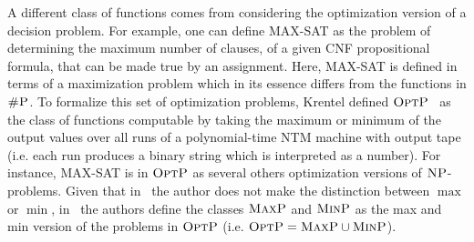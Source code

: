 A different class of functions comes from considering the optimization version of a decision problem. For example, one can define MAX-SAT as the problem of determining the maximum number of clauses, of a given CNF propositional formula, that can be made true by an assignment. Here, MAX-SAT is defined in terms of a maximization problem which in its essence differs from the functions in $\text{\sc \#P}$. 
To formalize this set of optimization problems, Krentel defined $\text{\sc OptP}$~\cite{krentel1988complexity} as the class of functions computable by taking the maximum or minimum of the output values over all runs of a polynomial-time NTM machine with output tape (i.e. each run produces a binary string which is interpreted as a number). 
For instance, MAX-SAT is in $\text{\sc OptP}$ as several others optimization versions of $\text{\sc NP}$-problems.
Given that in~\cite{krentel1988complexity} the author does not make the distinction between $\max$ or $\min$, in~\cite{vollmer1995complexity} the authors define the classes $\text{\sc MaxP}$ and $\text{\sc MinP}$ as the max and min version of the problems in $\text{\sc OptP}$ (i.e. $\text{\sc OptP} = \text{\sc MaxP} \cup \text{\sc MinP}$).


